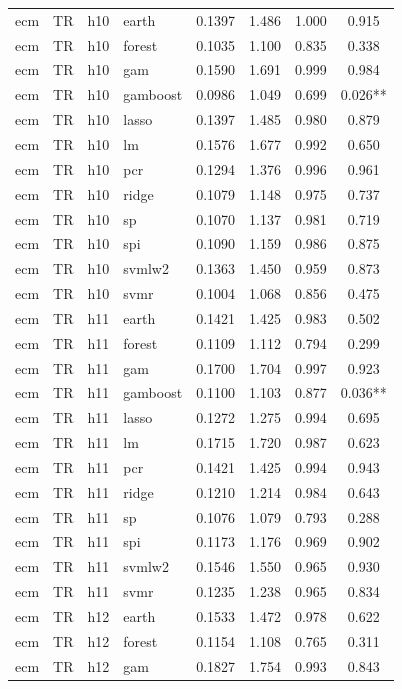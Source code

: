 \begin{ThreePartTable}
\begin{longtable}[t]{llclcccc}
\addlinespace
ecm & TR & h10 & earth & 0.1397 & 1.486 & 1.000 & 0.915\\
ecm & TR & h10 & forest & 0.1035 & 1.100 & 0.835 & 0.338\\
ecm & TR & h10 & gam & 0.1590 & 1.691 & 0.999 & 0.984\\
ecm & TR & h10 & gamboost & 0.0986 & 1.049 & 0.699 & 0.026**\\
ecm & TR & h10 & lasso & 0.1397 & 1.485 & 0.980 & 0.879\\
ecm & TR & h10 & lm & 0.1576 & 1.677 & 0.992 & 0.650\\
ecm & TR & h10 & pcr & 0.1294 & 1.376 & 0.996 & 0.961\\
ecm & TR & h10 & ridge & 0.1079 & 1.148 & 0.975 & 0.737\\
ecm & TR & h10 & sp & 0.1070 & 1.137 & 0.981 & 0.719\\
ecm & TR & h10 & spi & 0.1090 & 1.159 & 0.986 & 0.875\\
ecm & TR & h10 & svmlw2 & 0.1363 & 1.450 & 0.959 & 0.873\\
ecm & TR & h10 & svmr & 0.1004 & 1.068 & 0.856 & 0.475\\
\addlinespace
ecm & TR & h11 & earth & 0.1421 & 1.425 & 0.983 & 0.502\\
ecm & TR & h11 & forest & 0.1109 & 1.112 & 0.794 & 0.299\\
ecm & TR & h11 & gam & 0.1700 & 1.704 & 0.997 & 0.923\\
ecm & TR & h11 & gamboost & 0.1100 & 1.103 & 0.877 & 0.036**\\
ecm & TR & h11 & lasso & 0.1272 & 1.275 & 0.994 & 0.695\\
ecm & TR & h11 & lm & 0.1715 & 1.720 & 0.987 & 0.623\\
ecm & TR & h11 & pcr & 0.1421 & 1.425 & 0.994 & 0.943\\
ecm & TR & h11 & ridge & 0.1210 & 1.214 & 0.984 & 0.643\\
ecm & TR & h11 & sp & 0.1076 & 1.079 & 0.793 & 0.288\\
ecm & TR & h11 & spi & 0.1173 & 1.176 & 0.969 & 0.902\\
ecm & TR & h11 & svmlw2 & 0.1546 & 1.550 & 0.965 & 0.930\\
ecm & TR & h11 & svmr & 0.1235 & 1.238 & 0.965 & 0.834\\
\addlinespace
ecm & TR & h12 & earth & 0.1533 & 1.472 & 0.978 & 0.622\\
ecm & TR & h12 & forest & 0.1154 & 1.108 & 0.765 & 0.311\\
ecm & TR & h12 & gam & 0.1827 & 1.754 & 0.993 & 0.843\\

\end{longtable}
\end{ThreePartTable}

